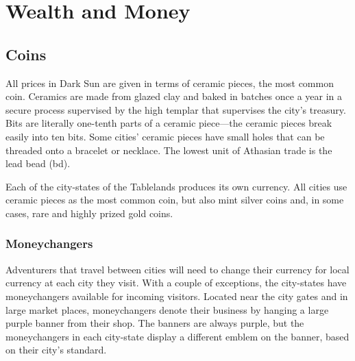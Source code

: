 \section{Wealth and Money}
\subsection{Coins}
All prices in Dark Sun are given in terms of ceramic pieces, the most common coin. Ceramics are made from glazed clay and baked in batches once a year in a secure process supervised by the high templar that supervises the city's treasury. Bits are literally one-tenth parts of a ceramic piece---the ceramic pieces break easily into ten bits. Some cities' ceramic pieces have small holes that can be threaded onto a bracelet or necklace. The lowest unit of Athasian trade is the lead bead (bd).

Each of the city-states of the Tablelands produces its own currency. All cities use ceramic pieces as the most common coin, but also mint silver coins and, in some cases, rare and highly prized gold coins.


\subsubsection{Moneychangers}
Adventurers that travel between cities will need to change their currency for local currency at each city they visit. With a couple of exceptions, the city-states have moneychangers available for incoming visitors. Located near the city gates and in large market places, moneychangers denote their business by hanging a large purple banner from their shop. The banners are always purple, but the moneychangers in each city-state display a different emblem on the banner, based on their city's standard.

